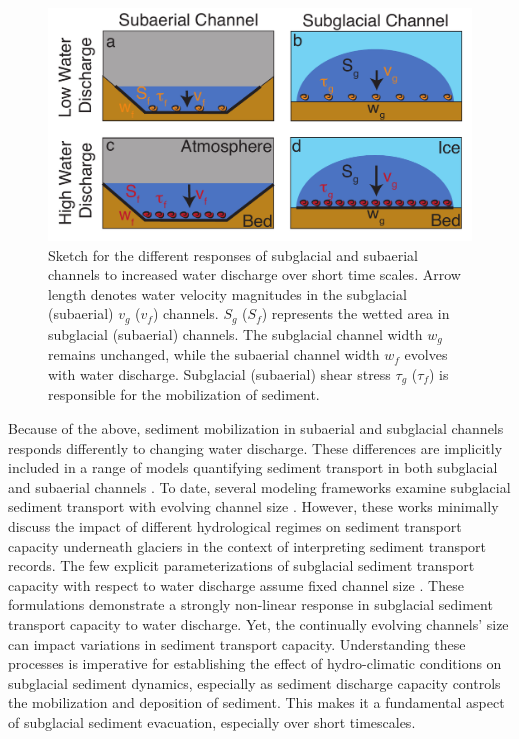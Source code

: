 \documentclass[tc, manuscript]{copernicus}
\begin{document}
\begin{figure}[hbt!]
  \centering
  \includegraphics[width=0.8\linewidth]{Fig1.pdf}
  \caption{Sketch for the different responses of subglacial and subaerial channels to increased water discharge over short time scales.
    Arrow length denotes water velocity magnitudes in the subglacial (subaerial) $v_g$ ($v_f$) channels.
    $S_g$ ($S_f$) represents the wetted area in subglacial (subaerial) channels.
    The subglacial channel width $w_g$ remains unchanged, while the subaerial channel width $w_f$ evolves with water discharge.
    Subglacial (subaerial) shear stress $\tau_g$ ($\tau_f$) is responsible for the mobilization of sediment.
  }
  \label{fig:cartoon}
\end{figure}

Because of the above, sediment mobilization in subaerial and subglacial channels responds differently to changing water discharge.
These differences are implicitly included in a range of models quantifying sediment transport in both subglacial and subaerial channels  \citep[e.g.][]{walder1994,alley1997,tucker1997,creyts2013,beaud2018,delaney2019,hewitt2019,wickert2019}.
To date, several modeling frameworks examine subglacial sediment transport with evolving channel size \citep{creyts2013,beaud2018,delaney2019,hewitt2019}.
However, these works minimally discuss the impact of different hydrological regimes on sediment transport capacity underneath glaciers in the context of interpreting sediment transport records.
The few explicit parameterizations of subglacial sediment transport capacity with respect to water discharge assume fixed channel size  \citep{alley1997}. 
These formulations demonstrate a strongly non-linear response in subglacial sediment transport capacity to water discharge.
Yet, the continually evolving channels' size can impact variations in sediment transport capacity.
Understanding these processes is imperative for establishing the effect of hydro-climatic conditions on subglacial sediment dynamics,
especially as sediment discharge capacity controls the mobilization and deposition of sediment.
This makes it a fundamental aspect of subglacial sediment evacuation, especially over short timescales.
\end{document}
